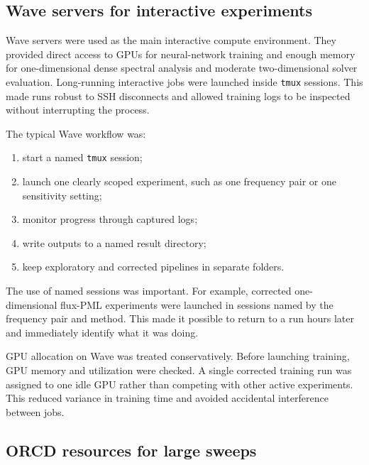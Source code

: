 \subsection{Wave servers for interactive experiments}
\label{subsec:computational_wave}

Wave servers were used as the main interactive compute environment. They
provided direct access to GPUs for neural-network training and enough memory
for one-dimensional dense spectral analysis and moderate two-dimensional
solver evaluation. Long-running interactive jobs were launched inside
\texttt{tmux} sessions. This made runs robust to SSH disconnects and allowed
training logs to be inspected without interrupting the process.

The typical Wave workflow was:
\begin{enumerate}
    \item start a named \texttt{tmux} session;
    \item launch one clearly scoped experiment, such as one frequency pair or
    one sensitivity setting;
    \item monitor progress through captured logs;
    \item write outputs to a named result directory;
    \item keep exploratory and corrected pipelines in separate folders.
\end{enumerate}
The use of named sessions was important. For example, corrected
one-dimensional flux-PML experiments were launched in sessions named by the
frequency pair and method. This made it possible to return to a run hours
later and immediately identify what it was doing.

GPU allocation on Wave was treated conservatively. Before launching training,
GPU memory and utilization were checked. A single corrected training run was
assigned to one idle GPU rather than competing with other active experiments.
This reduced variance in training time and avoided accidental interference
between jobs.


\subsection{ORCD resources for large sweeps}
\label{subsec:computational_orcd}

